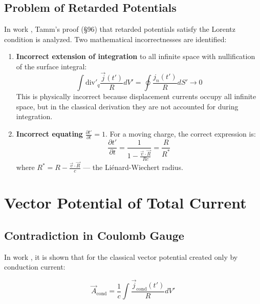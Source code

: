 \documentclass[12pt, a4paper]{article}
\begin{document}
\subsection{Problem of Retarded Potentials}

In work \cite{LaggingPotentials}, Tamm's proof (§96) that retarded potentials satisfy the Lorentz condition is analyzed. Two mathematical incorrectnesses are identified:

\begin{enumerate}
    \item \textbf{Incorrect extension of integration} to all infinite space with nullification of the surface integral:
    \begin{equation}
    \int \text{div}'_q \frac{\vec{j}(t')}{R} dV' = \oint \frac{j_n(t')}{R} dS' \longrightarrow 0
    \label{eq:gauss_error}
    \end{equation}
    This is physically incorrect because displacement currents occupy all infinite space, but in the classical derivation they are not accounted for during integration.

    \item \textbf{Incorrect equating} $\frac{\partial t'}{\partial t} = 1$. For a moving charge, the correct expression is:
    \begin{equation}
    \frac{\partial t'}{\partial t} = \frac{1}{1 - \frac{\vec{v} \cdot \vec{R}}{Rc}} = \frac{R}{R^*}
    \label{eq:retarded_time}
    \end{equation}
    where $R^* = R - \frac{\vec{v} \cdot \vec{R}}{c}$ --- the Liénard-Wiechert radius.
\end{enumerate}

\section{Vector Potential of Total Current}

\subsection{Contradiction in Coulomb Gauge}

In work \cite{CoulombCalib}, it is shown that for the classical vector potential created only by conduction current:

\begin{equation}
\vec{A}_{\text{cond}} = \frac{1}{c} \int \frac{\vec{j}_{\text{cond}}(t')}{R} dV'
\label{eq:vector_potential_cond}
\end{equation}
\end{document}
